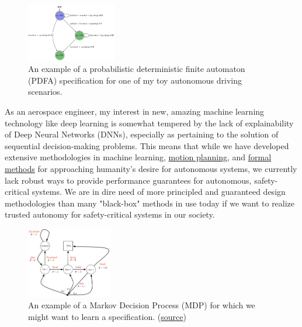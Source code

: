 \begin{figure}
\vspace{-1.0cm}
  \begin{center}
    \includegraphics[width=0.35\textwidth]{Figures/PDFA.png}
  \end{center}
  \caption{An example of a probabilistic deterministic finite automaton (PDFA) specification for one of my toy autonomous driving scenarios.}
  \label{fig: driving_pdfa_spec}
  \vspace{0.4cm}
\end{figure}

As an aerospace engineer, my interest in new, amazing machine learning technology like deep learning is somewhat tempered by the lack of explainability of Deep Neural Networks (DNNs), especially as pertaining to the solution of sequential decision-making problems. This means that while we have developed extensive methodologies in machine learning, \href{https://en.wikipedia.org/wiki/Motion_planning}{motion planning}, and \href{https://en.wikipedia.org/wiki/Formal_methods}{formal methods} for approaching humanity's desire for autonomous systems, we currently lack robust ways to provide performance guarantees for autonomous, safety-critical systems. We are in dire need of more principled and guaranteed design methodologies than many "black-box" methods in use today if we want to realize trusted autonomy for safety-critical systems in our society.

\begin{figure}
  \vspace{-0.7cm}
  \begin{center}
    \includegraphics[width=0.33\textwidth]{Figures/MDP.png}
  \end{center}
  \caption{An example of a Markov Decision Process (MDP) for which we might want to learn a specification. (\href{https://medium.com/@bibekchaudhary/markov-decision-process-mdp-simplified-1ae44cf53cc1}{source})}
  \label{fig: mdp}
  \vspace{-0.3cm}
\end{figure}

